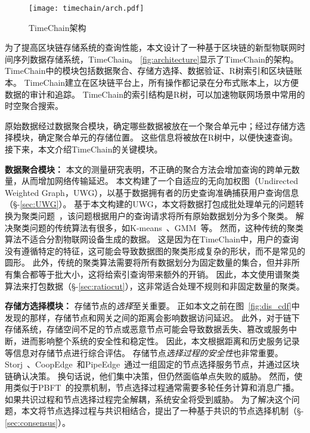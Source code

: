 \begin{figure}[t]
    \centering
    \texttt{[image: timechain/arch.pdf]}
    \caption{TimeChain架构}
    \label{fig:architecture}
\end{figure}

为了提高区块链存储系统的查询性能，本文设计了一种基于区块链的新型物联网时间序列数据存储系统，TimeChain。
\autoref{fig:architecture}显示了TimeChain的架构。
TimeChain中的模块包括数据聚合、存储方选择、数据验证、R树索引和区块链账本。
TimeChain建立在区块链平台上，所有操作都记录在分布式账本上，以方便数据的审计和追踪。
TimeChain的索引结构是R树，可以加速物联网场景中常用的时空聚合搜索。

原始数据经过数据聚合模块，确定哪些数据被放在一个聚合单元中；经过存储方选择模块，确定聚合单元的存储位置。
这些信息将被放在R树中，以便快速查询。
接下来，本文介绍TimeChain的关键模块。

\textbf{数据聚合模块：}
本文的测量研究表明，不正确的聚合方法会增加查询的跨单元数量，从而增加网络传输延迟。
本文构建了一个自适应的无向加权图（Undirected Weighted Graph，UWG），以基于数据拥有者的历史查询准确捕获用户查询信息（§-\ref{sec:UWG}）。
基于本文构建的UWG，本文将数据打包成批处理单元的问题转换为聚类问题~\cite{xu2005survey}，该问题根据用户的查询请求将所有原始数据划分为多个聚类。
解决聚类问题的传统算法有很多，如K-means~\cite{kanungo2002efficient}、GMM~\cite{he2010laplacian}等。
然而，这种传统的聚类算法不适合分割物联网设备生成的数据。
这是因为在TimeChain中，用户的查询没有遵循特定的特征，这可能会导致数据图的聚类形成复杂的形状，而不是常见的圆形。
此外，传统的聚类算法需要将所有数据划分为固定数量的集合，但并非所有集合都等于批大小，这将给索引查询带来额外的开销。
因此，本文使用谱聚类算法来打包数据（§-\ref{sec:ratiocut}），这非常适合处理不规则和非固定数量的聚类。

\textbf{存储方选择模块：}
存储节点的\textit{选择}至关重要。
正如本文之前在图~\autoref{fig:dis_cdf}中发现的那样，存储节点和网关之间的距离会影响数据访问延迟。
此外，对于链下存储系统，存储空间不足的节点或恶意节点可能会导致数据丢失、篡改或服务中断，进而影响整个系统的安全性和稳定性。
因此，本文根据距离和历史服务记录等信息对存储节点进行综合评估。
存储节点\textit{选择过程的安全性}也非常重要。
Storj~\cite{storj2018storj}、CoopEdge~\cite{yuan2021coopedge}和PipeEdge~\cite{yuan2023pipeedge}通过一组固定的节点选择服务节点，并通过区块链确认决策。
换句话说，他们集中决策，但仍然面临单点失败的威胁。
然而，使用类似于PBFT~\cite{li2020scalable}的投票机制，节点选择过程通常需要多轮任务计算和消息广播。
如果共识过程和节点选择过程完全解耦，系统安全将受到威胁。
为了解决这个问题，本文将节点选择过程与共识相结合，提出了一种基于共识的节点选择机制（§-\ref{sec:consensus}）。

